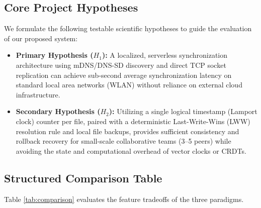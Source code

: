 \documentclass[11pt,oneside]{article}
\begin{document}
\subsection{Core Project Hypotheses}
We formulate the following testable scientific hypotheses to guide the evaluation of our proposed system:
\begin{itemize}
    \item \textbf{Primary Hypothesis ($H_1$):} A localized, serverless synchronization architecture using mDNS/DNS-SD discovery and direct TCP socket replication can achieve sub-second average synchronization latency on standard local area networks (WLAN) without reliance on external cloud infrastructure.
    \item \textbf{Secondary Hypothesis ($H_2$):} Utilizing a single logical timestamp (Lamport clock) counter per file, paired with a deterministic Last-Write-Wins (LWW) resolution rule and local file backups, provides sufficient consistency and rollback recovery for small-scale collaborative teams (3–5 peers) while avoiding the state and computational overhead of vector clocks or CRDTs.
\end{itemize}

\subsection{Structured Comparison Table}
Table \ref{tab:comparison} evaluates the feature tradeoffs of the three paradigms.
\end{document}
